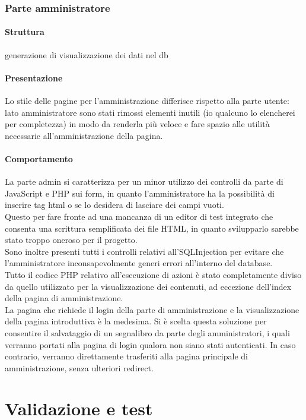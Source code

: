 \documentclass[openany, a4paper, 12pt]{report}
\begin{document}
	\subsection{Parte amministratore}
		\subsubsection{Struttura}
		generazione di visualizzazione dei dati nel db
		\subsubsection{Presentazione}
		Lo stile delle pagine per l'amministrazione differisce rispetto alla parte utente: lato amministratore sono stati rimossi elementi inutili ({\color{red}io qualcuno lo elencherei per completezza}) in modo da renderla più veloce e fare spazio alle utilità necessarie all'amministrazione della pagina.
		\subsubsection{Comportamento}
		La parte admin si caratterizza per un minor utilizzo dei controlli da parte di JavaScript e PHP sui form, in quanto l'amministratore ha la possibilità di inserire tag html o se lo desidera di lasciare dei campi vuoti.\\
		Questo per fare fronte ad una mancanza di un editor di test integrato che consenta una scrittura semplificata dei file HTML, in quanto svilupparlo sarebbe stato troppo oneroso per il progetto.\\
		Sono inoltre presenti tutti i controlli relativi all'SQLInjection per evitare che l'amministratore inconsapevolmente generi errori all'interno del database.\\
		Tutto il codice PHP relativo all'esecuzione di azioni è stato completamente diviso da quello utilizzato per la visualizzazione dei contenuti, ad eccezione dell'index della pagina di amministrazione.\\
		La pagina che richiede il login della parte di amministrazione e la visualizzazione della pagina introduttiva è la medesima. Si è scelta questa soluzione per consentire il salvataggio di un segnalibro da parte degli amministratori, i quali verranno portati alla pagina di login qualora non siano stati autenticati. In caso contrario, verranno direttamente trasferiti alla pagina principale di amministrazione, senza ulteriori redirect.

	\chapter{Validazione e test}
\end{document}
